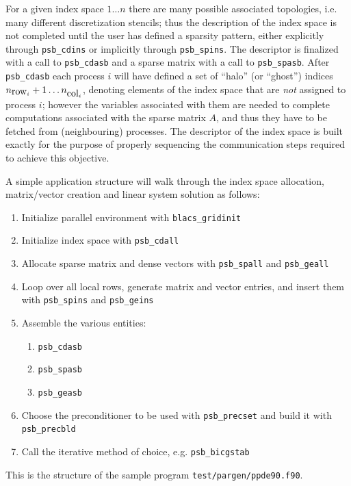 For  a given index space $1\dots n$ there are many possible associated
topologies, i.e. many different discretization stencils; thus the
description of the index space is not completed until the user has
defined a sparsity pattern, either explicitly through \verb|psb_cdins|
or implicitly through \verb|psb_spins|. The descriptor is finalized
with a call to \verb|psb_cdasb| and a sparse matrix with a call to
\verb|psb_spasb|. After \verb|psb_cdasb| each process $i$ will have
defined a set of ``halo'' (or ``ghost'') indices
$n_{\hbox{row}_i}+1\dots n_{\hbox{col}_i}$, denoting elements of the index
space that are \emph{not} assigned to process $i$; however the
variables associated with them are needed to complete computations
associated with the sparse matrix $A$, and thus they have to be
fetched from (neighbouring) processes. The descriptor of the index
space is built exactly for the purpose of properly sequencing the
communication steps required to achieve this objective. 

A simple application structure will walk through the index space
allocation, matrix/vector creation and linear system solution as
follows:
\begin{enumerate}
\item Initialize parallel environment with \verb|blacs_gridinit|
\item Initialize index space with \verb|psb_cdall|
\item Allocate sparse matrix and dense vectors with \verb|psb_spall|
  and \verb|psb_geall|
\item Loop over all local rows, generate matrix and vector entries,
  and insert them with \verb|psb_spins| and \verb|psb_geins|
\item Assemble the various entities: 
\begin{enumerate}
\item \verb|psb_cdasb|
\item \verb|psb_spasb|
\item \verb|psb_geasb|
\end{enumerate}
\item Choose the preconditioner to be used with \verb|psb_precset| and
  build it with \verb|psb_precbld|
\item Call the iterative method of choice, e.g. \verb|psb_bicgstab|
\end{enumerate}
This is the structure of the sample program
\verb|test/pargen/ppde90.f90|. 

